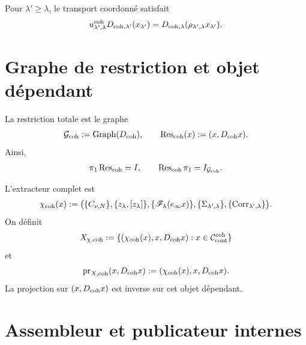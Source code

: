 Pour \(\lambda'\geq\lambda\), le transport coordonné satisfait
\begin{equation}\label{eq:pdfv2-coh-d-naturality}
 u_{\lambda',\lambda}^{\rm coh}
 D_{{\rm coh},\lambda'}(x_{\lambda'})
 =D_{{\rm coh},\lambda}
  (\rho_{\lambda',\lambda}x_{\lambda'}).
\end{equation}

\section{Graphe de restriction et objet dépendant}
\label{sec:pdfv2-coh-graphs}

La restriction totale est le graphe
\begin{equation}\label{eq:pdfv2-coh-g-graph}
 \mathcal G_{\rm coh}:=\operatorname{Graph}(D_{\rm coh}),
 \qquad
 \operatorname{Res}_{\rm coh}(x):=(x,D_{\rm coh}x).
\end{equation}
Ainsi,
\begin{equation}\label{eq:pdfv2-coh-res-inverse}
 \pi_1\operatorname{Res}_{\rm coh}=I,
 \qquad
 \operatorname{Res}_{\rm coh}\pi_1=I_{\mathcal G_{\rm coh}}.
\end{equation}

L'extracteur complet est
\begin{equation}\label{eq:pdfv2-coh-chi}
 \chi_{\rm coh}(x):=
 \bigl(
 \{C_{\nu,N}\},
 \{z_\lambda,[z_\lambda]\},
 \{\mathscr F_\lambda(e_\infty x)\},
 \{\Sigma_{\lambda',\lambda}\},
 \{\operatorname{Corr}_{\lambda',\lambda}\}
 \bigr).
\end{equation}
On définit
\begin{equation}\label{eq:pdfv2-coh-xchi}
 X_{\chi,{\rm coh}}
 :=\{(\chi_{\rm coh}(x),x,D_{\rm coh}x):
 x\in\mathcal C_{\rm cont}^{\rm coh}\}
\end{equation}
et
\begin{equation}\label{eq:pdfv2-coh-prx}
 \operatorname{pr}_{X,{\rm coh}}(x,D_{\rm coh}x)
 :=(\chi_{\rm coh}(x),x,D_{\rm coh}x).
\end{equation}
La projection sur \((x,D_{\rm coh}x)\) est inverse sur cet objet
dépendant.

\section{Assembleur et publicateur internes}
\label{sec:pdfv2-coh-assembler-publisher}

